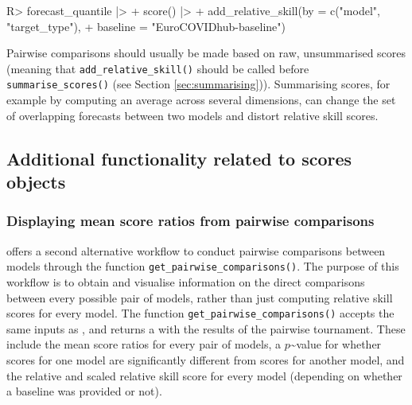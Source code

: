 \documentclass[
]{jss}
\begin{document}
\begin{CodeChunk}
\begin{CodeInput}
R> forecast_quantile |>
+   score() |>
+   add_relative_skill(by = c("model", "target_type"), 
+                      baseline = "EuroCOVIDhub-baseline")
\end{CodeInput}
\end{CodeChunk}

Pairwise comparisons should usually be made based on raw, unsummarised
scores (meaning that \texttt{add\_relative\_skill()} should be called
before \texttt{summarise\_scores()} (see Section
\ref{sec:summarising})). Summarising scores, for example by computing an
average across several dimensions, can change the set of overlapping
forecasts between two models and distort relative skill scores.

\subsection{Additional functionality related to scores
objects}\label{additional-functionality-related-to-scores-objects}

\subsubsection{Displaying mean score ratios from pairwise
comparisons}\label{displaying-mean-score-ratios-from-pairwise-comparisons}

 offers a second alternative workflow to conduct
pairwise comparisons between models through the function
\texttt{get\_pairwise\_comparisons()}. The purpose of this workflow is
to obtain and visualise information on the direct comparisons between
every possible pair of models, rather than just computing relative skill
scores for every model. The function
\texttt{get\_pairwise\_comparisons()} accepts the same inputs as
, and returns a  with the
results of the pairwise tournament. These include the mean score ratios
for every pair of models, a \(p\)\textasciitilde value for whether
scores for one model are significantly different from scores for another
model, and the relative and scaled relative skill score for every model
(depending on whether a baseline was provided or not).
\end{document}

